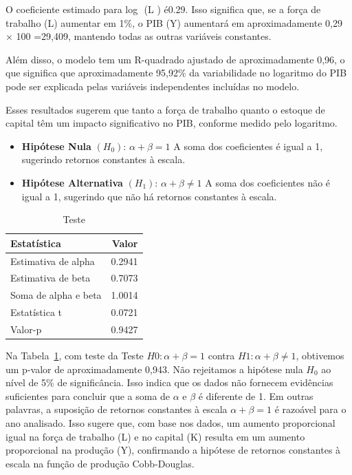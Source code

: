 \documentclass[
  letterpaper,
  DIV=11,
  numbers=noendperiod]{scrreprt}
\providecommand{\tightlist}{%
  \setlength{\itemsep}{0pt}\setlength{\parskip}{0pt}}\usepackage{longtable,booktabs,array}
\begin{document}
O coeficiente estimado para log ⁡ (L ) é0.29. Isso significa que, se a
força de trabalho (L) aumentar em 1\%, o PIB (Y) aumentará em
aproximadamente 0,29 × 100 =29,409, mantendo todas as outras variáveis
constantes.

Além disso, o modelo tem um R-quadrado ajustado de aproximadamente 0,96,
o que significa que aproximadamente 95,92\% da variabilidade no
logaritmo do PIB pode ser explicada pelas variáveis independentes
incluídas no modelo.

Esses resultados sugerem que tanto a força de trabalho quanto o estoque
de capital têm um impacto significativo no PIB, conforme medido pelo
logaritmo.

\begin{itemize}
\tightlist
\item
  \textbf{Hipótese Nula} \((H_0)\): \(\alpha + \beta = 1\) A soma dos
  coeficientes é igual a 1, sugerindo retornos constantes à escala.
\item
  \textbf{Hipótese Alternativa} \((H_1)\): \(\alpha + \beta \neq 1\) A
  soma dos coeficientes não é igual a 1, sugerindo que não há retornos
  constantes à escala.
\end{itemize}

\begin{longtable}[]{@{}lr@{}}

\caption{\label{tbl-teste1}Teste}

\tabularnewline

\toprule\noalign{}
Estatística & Valor \\
\midrule\noalign{}
\endhead
\bottomrule\noalign{}
\endlastfoot
Estimativa de alpha & 0.2941 \\
Estimativa de beta & 0.7073 \\
Soma de alpha e beta & 1.0014 \\
Estatística t & 0.0721 \\
Valor-p & 0.9427 \\

\end{longtable}

Na Tabela~\ref{tbl-teste1}, com teste da Teste \(𝐻0 : 𝛼 + 𝛽 = 1\) contra
\(𝐻1 : 𝛼 + 𝛽 ≠ 1\), obtivemos um p-valor de aproximadamente 0,943. Não
rejeitamos a hipótese nula \(H_0\) ao nível de 5\% de significância.
Isso indica que os dados não fornecem evidências suficientes para
concluir que a soma de \(\alpha\) e \(\beta\) é diferente de 1. Em
outras palavras, a suposição de retornos constantes à escala
\(\alpha + \beta = 1\) é razoável para o ano analisado. Isso sugere que,
com base nos dados, um aumento proporcional igual na força de trabalho
(L) e no capital (K) resulta em um aumento proporcional na produção (Y),
confirmando a hipótese de retornos constantes à escala na função de
produção Cobb-Douglas.
\end{document}
